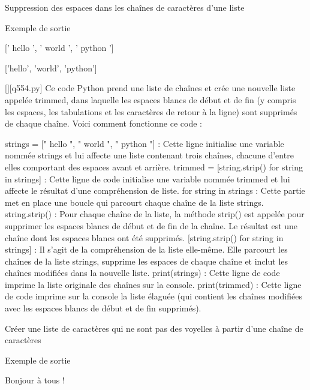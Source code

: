         \question
        Suppression des espaces dans les chaînes de caractères d'une liste

Exemple de sortie

[' hello ', ' world ', ' python ']

['hello', 'world', 'python']
        \par
        \begin{solution}
            \renewcommand{\nomfichier}{q554.py}
            \pythonfile{\chemincode \nomfichier}[][\nomfichier]
            Ce code Python prend une liste de chaînes et crée une nouvelle liste appelée trimmed, dans laquelle les espaces blancs de début et de fin (y compris les espaces, les tabulations et les caractères de retour à la ligne) sont supprimés de chaque chaîne. Voici comment fonctionne ce code :

    strings = [" hello ", " world ", " python "] : Cette ligne initialise une variable nommée strings et lui affecte une liste contenant trois chaînes, chacune d'entre elles comportant des espaces avant et arrière.
    trimmed = [string.strip() for string in strings] : Cette ligne de code initialise une variable nommée trimmed et lui affecte le résultat d'une compréhension de liste.
        for string in strings : Cette partie met en place une boucle qui parcourt chaque chaîne de la liste strings.
        string.strip() : Pour chaque chaîne de la liste, la méthode strip() est appelée pour supprimer les espaces blancs de début et de fin de la chaîne. Le résultat est une chaîne dont les espaces blancs ont été supprimés.
        [string.strip() for string in strings] : Il s'agit de la compréhension de la liste elle-même. Elle parcourt les chaînes de la liste strings, supprime les espaces de chaque chaîne et inclut les chaînes modifiées dans la nouvelle liste.
    print(strings) : Cette ligne de code imprime la liste originale des chaînes sur la console.
    print(trimmed) : Cette ligne de code imprime sur la console la liste élaguée (qui contient les chaînes modifiées avec les espaces blancs de début et de fin supprimés).
        \end{solution}
        

        \question
        Créer une liste de caractères qui ne sont pas des voyelles à partir d'une chaîne de caractères

Exemple de sortie

Bonjour à tous !

